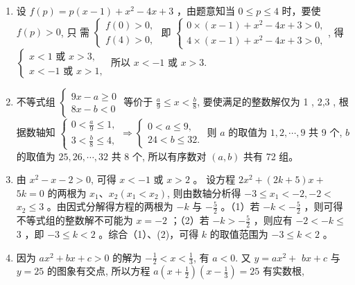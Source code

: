 \documentclass[10pt]{article}
\begin{document}
\begin{enumerate}
  \item 设 $f(p)=p(x-1)+x^{2}-4 x+3$ ，由题意知当 $0 \leqslant p \leqslant 4$ 时，要使 $f(p)>0$, 只 需 $\left\{\begin{array}{l}f(0)>0, \\ f(4)>0,\end{array}\right.$ 即 $\left\{\begin{array}{l}0 \times(x-1)+x^{2}-4 x+3>0, \\ 4 \times(x-1)+x^{2}-4 x+3>0,\end{array}\right.$, 得 $\left\{\begin{array}{l}x<1 \text { 或 } x>3, \\ x<-1 \text { 或 } x>1,\end{array}\right.$ 所以 $x<-1$ 或 $x>3$.
  \item 不等式组 $\left\{\begin{array}{l}9 x-a \geqslant 0 \\ 8 x-b<0\end{array}\right.$ 等价于 $\frac{a}{9} \leqslant x<\frac{b}{8}$, 要使满足的整数解仅为 1 , 2,3 , 根据数轴知 $\left\{\begin{array}{l}0<\frac{a}{9} \leqslant 1, \\ 3<\frac{b}{8} \leqslant 4,\end{array} \Rightarrow\left\{\begin{array}{l}0<a \leqslant 9, \\ 24<b \leqslant 32 .\end{array}\right.\right.$ 则 $a$ 的取值为 $1,2, \cdots, 9$ 共 9 个, $b$ 的取值为 $25,26, \cdots, 32$ 共 8 个, 所以有序数对 $(a, b)$ 共有 72 组。
  \item 由 $x^{2}-x-2>0$, 可得 $x<-1$ 或 $x>2$ 。 设方程 $2 x^{2}+(2 k+5) x+$ $5 k=0$ 的两根为 $x_{1} 、 x_{2}\left(x_{1}<x_{2}\right)$, 则由数轴分析得 $-3 \leqslant x_{1}<-2,-2<$ $x_{2} \leqslant 3$ 。由因式分解得方程的两根为 $-k$ 与 $-\frac{5}{2}$ 。（1）若 $-k<-\frac{5}{2}$ ，则可得不等式组的整数解不可能为 $x=-2$ ；（2）若 $-k>-\frac{5}{2}$ ，则应有 $-2<-k \leqslant$ 3 ，即 $-3 \leqslant k<2$ 。综合（1）、(2)，可得 $k$ 的取值范围为 $-3 \leqslant k<2$ 。
  \item 因为 $a x^{2}+b x+c>0$ 的解为 $-\frac{1}{2}<x<\frac{1}{3}$, 有 $a<0$. 又 $y=a x^{2}+$ $b x+c$ 与 $y=25$ 的图象有交点, 所以方程 $a\left(x+\frac{1}{2}\right)\left(x-\frac{1}{3}\right)=25$ 有实数根,
\end{enumerate}
\end{document}
